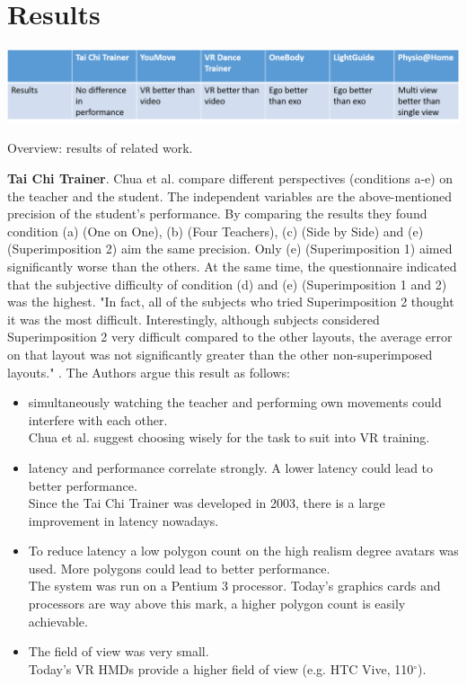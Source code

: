 \section{Results}
\begin{table}[h!]
	\centering
	\includegraphics[width=1.0\textwidth]{img/tbl5.png}
	\caption{Overview: results of related work.}
	\label{fig:tbl5}
\end{table}
\textbf{Tai Chi Trainer}. Chua et al. compare different perspectives (conditions a-e) on the teacher and the student. The independent variables are the above-mentioned precision of the student's performance. By comparing the results they found condition (a) (One on One), (b) (Four Teachers), (c) (Side by Side) and (e) (Superimposition 2) aim the same precision. Only (e) (Superimposition 1) aimed significantly worse than the others. At the same time, the questionnaire indicated that the subjective difficulty of condition (d) and (e) (Superimposition 1 and 2) was the highest. "In fact, all of the subjects who tried Superimposition 2 thought it was the most difficult. Interestingly, although subjects considered Superimposition 2 very difficult compared to the other layouts, the average error on that layout was not significantly greater than the other non-superimposed layouts." \cite{Chua2003}. The Authors argue this result as follows:
\begin{itemize}
	\item simultaneously watching the teacher and performing own movements could interfere with each other.\\
	Chua et al. suggest choosing wisely for the task to suit into VR training.
	\item latency and performance correlate strongly. A lower latency could lead to better performance.\\
	Since the Tai Chi Trainer was developed in 2003, there is a large improvement in latency nowadays.
	\item To reduce latency a low polygon count on the high realism degree avatars was used. More polygons could lead to better performance.\\
	The system was run on a Pentium 3 processor. Today's graphics cards and processors are way above this mark, a higher polygon count is easily achievable.
	\item The field of view was very small.\\
	Today's VR HMDs provide a higher field of view (e.g. HTC Vive, 110$^\circ$).
\end{itemize}
